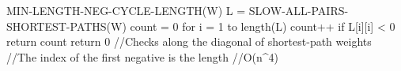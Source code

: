 MIN-LENGTH-NEG-CYCLE-LENGTH(W)
	L = SLOW-ALL-PAIRS-SHORTEST-PATHS(W)
	count = 0
	for i = 1 to length(L)
		count++
		if L[i][i] < 0
			return count
	return 0
//Checks along the diagonal of shortest-path weights
//The index of the first negative is the length
//O(n^4) 